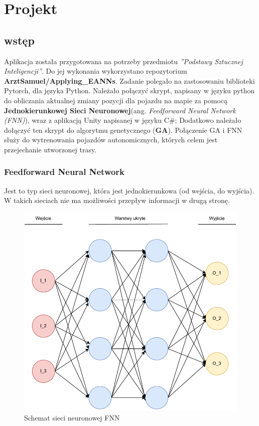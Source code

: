 \chapter{Projekt}
\section{wstęp}
Aplikacja została przygotowana na potrzeby przedmiotu \textit{''Podstawy Sztucznej Inteligencji''}. Do jej wykonania wykorzystano repozytorium \textbf{ArztSamuel/Applying\_EANNs}\cite{aeann_psi}. Zadanie polegało na zastosowaniu biblioteki Pytorch\cite{pytorch}, dla języka Python. Należało połączyć skrypt, napisany w języku python do obliczania aktualnej zmiany pozycji dla pojazdu na mapie za pomocą \textbf{Jednokierunkowej Sieci Neuronowej}(ang. \textit{Feedforward Neural Network (FNN)}), wraz z aplikacją Unity napisanej w języku C$\#$; Dodatkowo należało dołączyć ten skrypt do algorytmu genetycznego (\textbf{GA}). Połączenie GA i FNN służy do wytrenowania pojazdów autonomicznych, których celem jest przejechanie utworzonej trasy.  

\subsection{Feedforward Neural Network}
Jest to typ sieci neuronowej, która jest jednokierunkowa (od wejścia, do wyjścia). W takich sieciach nie ma możliwości przepływ informacji w drugą stronę.\cite{lnn}

\begin{figure}[H]
    \includegraphics[width=\textwidth]{images/fnn.pdf}
    \caption{Schemat sieci neuronowej FNN}
    \label{fig:fnn}
\end{figure}

